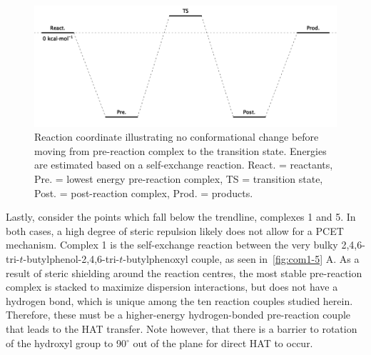 \begin{figure}[!htbp]
  \centering
  \includegraphics[width=\textwidth]{figures/afactor-direct.png}
  \caption[Reaction coordinate illustrating no conformational change before moving from pre-reaction complex to the transition state.]{Reaction coordinate illustrating no conformational change before moving from pre-reaction complex to the transition state. Energies are estimated based on a self-exchange reaction. React. = reactants, Pre. = lowest energy pre-reaction complex, TS = transition state, Post. = post-reaction complex, Prod. = products.}
\label{fig:afactor-direct}
\end{figure}

Lastly, consider the points which fall below the trendline, complexes 1 and 5. In both cases, a high degree of steric repulsion likely does not allow for a PCET mechanism. Complex 1 is the self-exchange reaction between the very bulky 2,4,6-tri-$t$-butylphenol-2,4,6-tri-$t$-butylphenoxyl couple, as seen in~\ref{fig:com1-5} A. As a result of steric shielding around the reaction centres, the most stable pre-reaction complex is stacked to maximize dispersion interactions, but does not have a hydrogen bond, which is unique among the ten reaction couples studied herein. Therefore, these must be a higher-energy hydrogen-bonded pre-reaction couple that leads to the HAT transfer. Note however, that there is a barrier to rotation of the hydroxyl group to 90$^\circ$ out of the plane for direct HAT to occur.

